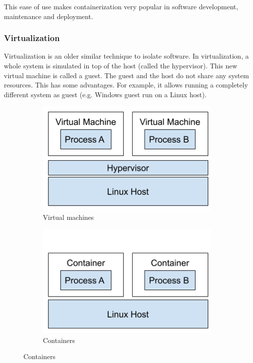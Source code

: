 \hfill

This ease of use makes containerization very popular in software development, maintenance and deployment.

\pagebreak

\subsubsection{Virtualization}
Virtualization is an older similar technique to isolate software. In virtualization, a whole system is simulated in top of the host (called the hypervisor). This new virtual machine is called a guest. The guest and the host do not share any system resources. This has some advantages. For example, it allows running a completely different system as guest (e.g. Windows guest run on a Linux host).

\begin{figure}[ht]
    \begin{subfigure}{.45\textwidth}
        \centering
        \includegraphics[width=.8\linewidth]{resources/images/virtual-machines.png}
        \caption{Virtual machines}
    \end{subfigure}
    \begin{subfigure}{.45\textwidth}
        \centering
        \includegraphics[width=.8\linewidth]{resources/images/containers.png}
        \caption{Containers}
    \end{subfigure}
\end{figure}

